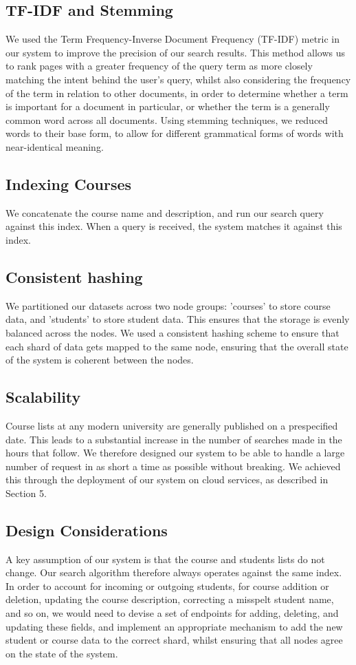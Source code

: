 \documentclass[sigplan, screen, 10pt]{acmart}
\begin{document}
\subsection{TF-IDF and Stemming}
We used the Term Frequency-Inverse Document Frequency (TF-IDF) metric in our system to improve the precision of our search results. This method allows us to rank pages with a greater frequency of the query term as more closely matching the intent behind the user's query, whilst also considering the frequency of the term in relation to other documents, in order to determine whether a term is important for a document in particular, or whether the term is a generally common word across all documents. Using stemming techniques, we reduced words to their base form, to allow for different grammatical forms of words with near-identical meaning.

\subsection{Indexing Courses}
We concatenate the course name and description, and run our search query against this index. When a query is received, the system matches it against this index.

\subsection{Consistent hashing}
We partitioned our datasets across two node groups: 'courses' to store course data, and 'students' to store student data. This ensures that the storage is evenly balanced across the nodes. We used a consistent hashing scheme to ensure that each shard of data gets mapped to the same node, ensuring that the overall state of the system is coherent between the nodes.

\subsection{Scalability}
Course lists at any modern university are generally published on a prespecified date. This leads to a substantial increase in the number of searches made in the hours that follow. We therefore designed our system to be able to handle a large number of request in as short a time as possible without breaking. We achieved this through the deployment of our system on cloud services, as described in Section 5.

\subsection{Design Considerations}
A key assumption of our system is that the course and students lists do not change. Our search algorithm therefore always operates against the same index. In order to account for incoming or outgoing students, for course addition or deletion, updating the course description, correcting a misspelt student name, and so on, we would need to devise a set of endpoints for adding, deleting, and updating these fields, and implement an appropriate mechanism to add the new student or course data to the correct shard, whilst ensuring that all nodes agree on the state of the system.
\end{document}

